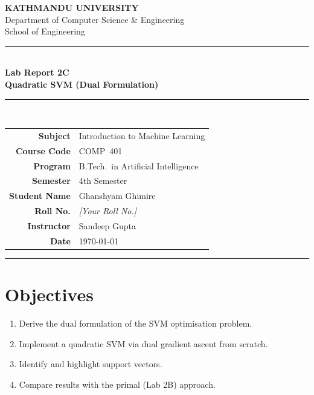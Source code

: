\documentclass[12pt,a4paper]{article}
\begin{document}
\begin{center}
  {\Large\bfseries\color{kuBlue} KATHMANDU UNIVERSITY}\\[4pt]
  {\normalsize Department of Computer Science \& Engineering}\\[2pt]
  {\normalsize School of Engineering}\\[10pt]
  \rule{\linewidth}{1.5pt}\\[6pt]
  {\large\bfseries Lab Report 2C}\\[4pt]
  {\LARGE\bfseries Quadratic SVM (Dual Formulation)}\\[4pt]
  \rule{\linewidth}{0.8pt}\\[10pt]
\end{center}

\begin{center}
\renewcommand{\arraystretch}{1.4}
\begin{tabular}{r l}
  \textbf{Subject}      & Introduction to Machine Learning \\
  \textbf{Course Code}  & COMP~401 \\
  \textbf{Program}      & B.Tech.\ in Artificial Intelligence \\
  \textbf{Semester}     & 4th Semester \\
  \textbf{Student Name} & Ghanshyam Ghimire \\
  \textbf{Roll No.}     & \textit{[Your Roll No.]} \\
  \textbf{Instructor}   & Sandeep Gupta \\
  \textbf{Date}         & \today \\
\end{tabular}
\end{center}
\vspace{10pt}\hrule\vspace{16pt}

\section{Objectives}
\begin{enumerate}[label=\arabic*.]
  \item Derive the dual formulation of the SVM optimisation problem.
  \item Implement a quadratic SVM via dual gradient ascent from scratch.
  \item Identify and highlight support vectors.
  \item Compare results with the primal (Lab 2B) approach.
\end{enumerate}
\end{document}

